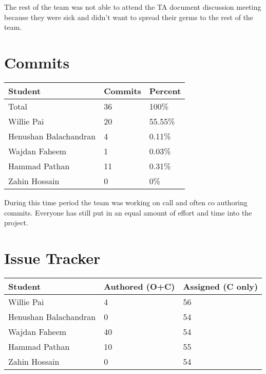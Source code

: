 \documentclass{article}
\begin{document}
The rest of the team was not able to attend the TA document discussion meeting because they were sick and didn't want to spread their germs to the rest of the team.

\section{Commits}


\begin{table}[H]
\centering
\begin{tabular}{lll}
\toprule
\textbf{Student} & \textbf{Commits} & \textbf{Percent}\\
\midrule
Total & 36 & 100\% \\
Willie Pai & 20 & 55.55\% \\
Henushan Balachandran & 4 & 0.11\% \\
Wajdan Faheem & 1 & 0.03\% \\
Hammad Pathan & 11 & 0.31\% \\
Zahin Hossain & 0 & 0\% \\
\bottomrule
\end{tabular}
\end{table}


During this time period the team was working on call and often co authoring commits. Everyone has still put in an equal amount of effort and time into the project.

\section{Issue Tracker}


\begin{table}[H]
\centering
\begin{tabular}{lll}
\toprule
\textbf{Student} & \textbf{Authored (O+C)} & \textbf{Assigned (C only)}\\
\midrule
Willie Pai & 4 & 56 \\
Henushan Balachandran & 0 & 54 \\
Wajdan Faheem & 40 & 54 \\
Hammad Pathan & 10 & 55 \\
Zahin Hossain & 0 & 54 \\
\bottomrule
\end{tabular}
\end{table}
\end{document}
